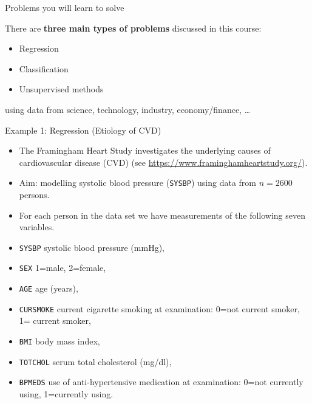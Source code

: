\documentclass[ignorenonframetext,]{beamer}
\providecommand{\tightlist}{%
  \setlength{\itemsep}{0pt}\setlength{\parskip}{0pt}}
\begin{document}
\begin{frame}{Problems you will learn to solve}

There are \textbf{three main types of problems} discussed in this
course:

\begin{itemize}
\item
  Regression
\item
  Classification
\item
  Unsupervised methods
\end{itemize}

using data from science, technology, industry, economy/finance, \ldots{}

\end{frame}

\begin{frame}[fragile]{Example 1: Regression (Etiology of CVD)}

\begin{itemize}
\item
  The Framingham Heart Study investigates the underlying causes of
  cardiovascular disease (CVD) (see
  \url{https://www.framinghamheartstudy.org/}). 
\item
  Aim: modelling systolic blood pressure (\texttt{SYSBP}) using data
  from \(n=2600\) persons.
\item
  For each person in the data set we have measurements of the following
  seven variables.
\end{itemize}

\scriptsize

\begin{itemize}
\tightlist
\item
  \texttt{SYSBP} systolic blood pressure (mmHg),
\item
  \texttt{SEX} 1=male, 2=female,
\item
  \texttt{AGE} age (years),
\item
  \texttt{CURSMOKE} current cigarette smoking at examination: 0=not
  current smoker, 1= current smoker,
\item
  \texttt{BMI} body mass index,
\item
  \texttt{TOTCHOL} serum total cholesterol (mg/dl),
\item
  \texttt{BPMEDS} use of anti-hypertensive medication at examination:
  0=not currently using, 1=currently using. \normalsize
\end{itemize}

\end{frame}
\end{document}
